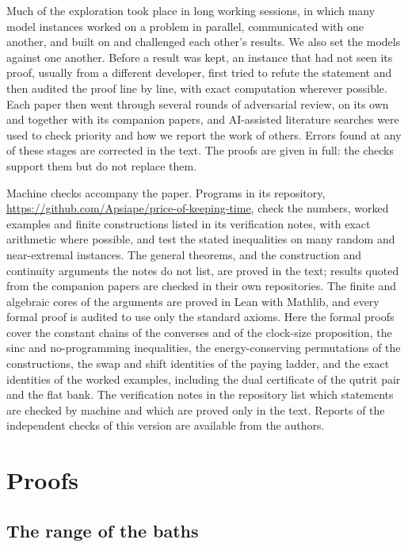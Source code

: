 \documentclass[11pt]{article}
\theoremstyle{definition}
\theoremstyle{remark}
\begin{document}
Much of the exploration took place in long working sessions, in which many model instances worked on a problem in parallel, communicated with one another, and built on and challenged each other's results. We also set the models against one another. Before a result was kept, an instance that had not seen its proof, usually from a different developer, first tried to refute the statement and then audited the proof line by line, with exact computation wherever possible. Each paper then went through several rounds of adversarial review, on its own and together with its companion papers, and AI-assisted literature searches were used to check priority and how we report the work of others. Errors found at any of these stages are corrected in the text. The proofs are given in full: the checks support them but do not replace them.

Machine checks accompany the paper. Programs in its repository, \url{https://github.com/Apsiape/price-of-keeping-time}, check the numbers, worked examples and finite constructions listed in its verification notes, with exact arithmetic where possible, and test the stated inequalities on many random and near-extremal instances. The general theorems, and the construction and continuity arguments the notes do not list, are proved in the text; results quoted from the companion papers are checked in their own repositories. The finite and algebraic cores of the arguments are proved in Lean with Mathlib, and every formal proof is audited to use only the standard axioms. Here the formal proofs cover the constant chains of the converses and of the clock-size proposition, the sinc and no-programming inequalities, the energy-conserving permutations of the constructions, the swap and shift identities of the paying ladder, and the exact identities of the worked examples, including the dual certificate of the qutrit pair and the flat bank. The verification notes in the repository list which statements are checked by machine and which are proved only in the text. Reports of the independent checks of this version are available from the authors.

\appendix
\section{Proofs}\label{app:proofs}

\subsection{The range of the baths}\label{pf:baths}
\end{document}
